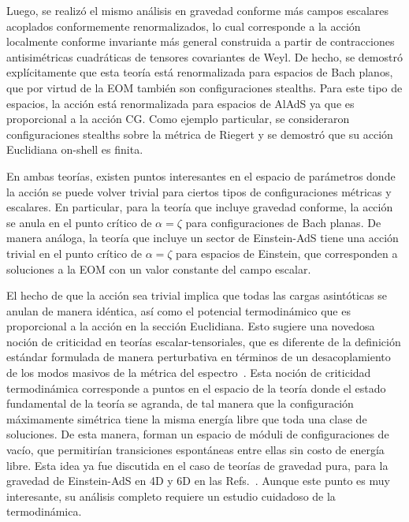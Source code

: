 \documentclass[../Main.tex]{subfiles}
\begin{document}
Luego, se realizó el mismo análisis en gravedad conforme más campos escalares acoplados conformemente renormalizados, lo cual corresponde a la acción localmente conforme invariante más general construida a partir de contracciones antisimétricas cuadráticas de tensores covariantes de Weyl. De hecho, se demostró explícitamente que esta teoría está renormalizada para espacios de Bach planos, que por virtud de la EOM también son configuraciones stealths. Para este tipo de espacios, la acción está renormalizada para espacios de AlAdS ya que es proporcional a la acción CG. Como ejemplo particular, se consideraron configuraciones stealths sobre la métrica de Riegert y se demostró que su acción Euclidiana on-shell es finita.

En ambas teorías, existen puntos interesantes en el espacio de parámetros donde la acción se puede volver trivial para ciertos tipos de configuraciones métricas y escalares. En particular, para la teoría que incluye gravedad conforme, la acción se anula en el punto crítico de $\alpha = \zeta$ para configuraciones de Bach planas. De manera análoga, la teoría que incluye un sector de Einstein-AdS tiene una acción trivial en el punto crítico de $\alpha = \zeta$ para espacios de Einstein, que corresponden a soluciones a la EOM con un valor constante del campo escalar.

El hecho de que la acción sea trivial implica que todas las cargas asintóticas se anulan de manera idéntica, así como el potencial termodinámico que es proporcional a la acción en la sección Euclidiana. Esto sugiere una novedosa noción de criticidad en teorías escalar-tensoriales, que es diferente de la definición estándar formulada de manera perturbativa en términos de un desacoplamiento de los modos masivos de la métrica del espectro~\cite{Lu:2011zk}. Esta noción de criticidad termodinámica corresponde a puntos en el espacio de la teoría donde el estado fundamental de la teoría se agranda, de tal manera que la configuración máximamente simétrica tiene la misma energía libre que toda una clase de soluciones. De esta manera, forman un espacio de móduli de configuraciones de vacío, que permitirían transiciones espontáneas entre ellas sin costo de energía libre. Esta idea ya fue discutida en el caso de teorías de gravedad pura, para la gravedad de Einstein-AdS en 4D y 6D en las Refs.~\cite{Anastasiou:2016jix,Anastasiou:2017rjf,Anastasiou:2021tlv}. Aunque este punto es muy interesante, su análisis completo requiere un estudio cuidadoso de la termodinámica.



\biblio %
\end{document}
